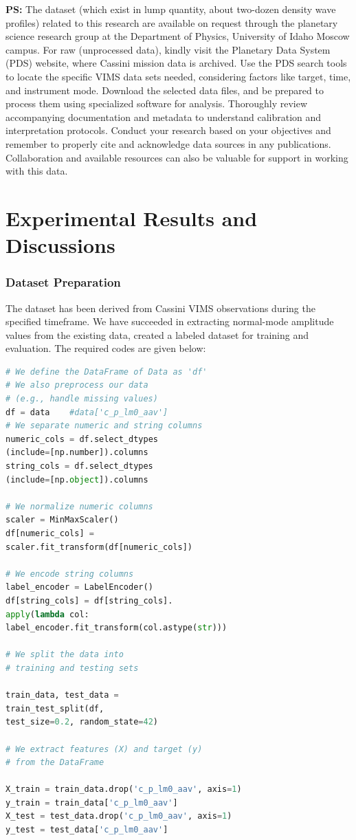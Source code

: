 \documentclass[conference]{IEEEtran}
\begin{document}
\textbf{PS:} The dataset (which exist in lump quantity, about two-dozen density wave profiles) related to this research are available on request through the planetary science research group at the Department of Physics, University of Idaho Moscow campus. For raw (unprocessed data), kindly visit the Planetary Data System (PDS) website, where Cassini mission data is archived. Use the PDS search tools to
locate the specific VIMS data sets needed, considering factors like target, time, and instrument mode.
Download the selected data files, and be prepared to process them using specialized software for analysis.
Thoroughly review accompanying documentation and metadata to understand calibration and interpretation
protocols. Conduct your research based on your objectives and remember to properly cite and acknowledge data
sources in any publications. Collaboration and available resources can also be valuable for support in working
with this data. 


\section{Experimental Results and Discussions}
\subsubsection{Dataset Preparation}
The dataset has been derived from Cassini VIMS observations during the specified timeframe. We have succeeded in extracting normal-mode amplitude values from the existing data, created a labeled dataset for training and evaluation. The required codes are given below:
\begin{lstlisting}[language=Python, caption=Data Preprocessing and Splitting, label=code:data-preprocessing]
# We define the DataFrame of Data as 'df'
# We also preprocess our data 
# (e.g., handle missing values)
df = data    #data['c_p_lm0_aav']
# We separate numeric and string columns
numeric_cols = df.select_dtypes
(include=[np.number]).columns
string_cols = df.select_dtypes
(include=[np.object]).columns

# We normalize numeric columns
scaler = MinMaxScaler()
df[numeric_cols] = 
scaler.fit_transform(df[numeric_cols])

# We encode string columns
label_encoder = LabelEncoder()
df[string_cols] = df[string_cols].
apply(lambda col: 
label_encoder.fit_transform(col.astype(str)))

# We split the data into 
# training and testing sets

train_data, test_data = 
train_test_split(df, 
test_size=0.2, random_state=42)

# We extract features (X) and target (y) 
# from the DataFrame

X_train = train_data.drop('c_p_lm0_aav', axis=1)
y_train = train_data['c_p_lm0_aav']
X_test = test_data.drop('c_p_lm0_aav', axis=1)
y_test = test_data['c_p_lm0_aav']
\end{lstlisting}
\end{document}
